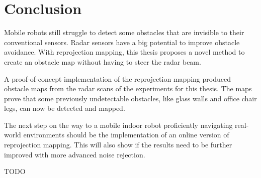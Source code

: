 \section{Conclusion}\label{conclusion-1}

Mobile robots still struggle to detect some obstacles that are invisible
to their conventional sensors. Radar sensors have a big potential to
improve obstacle avoidance. With reprojection mapping, this thesis
proposes a novel method to create an obstacle map without having to
steer the radar beam.

A proof-of-concept implementation of the reprojection mapping produced
obstacle maps from the radar scans of the experiments for this thesis.
The maps prove that some previously undetectable obstacles, like glass
walls and office chair legs, can now be detected and mapped.

The next step on the way to a mobile indoor robot proficiently
navigating real-world environments should be the implementation of an
online version of reprojection mapping. This will also show if the
results need to be further improved with more advanced noise rejection.

TODO

